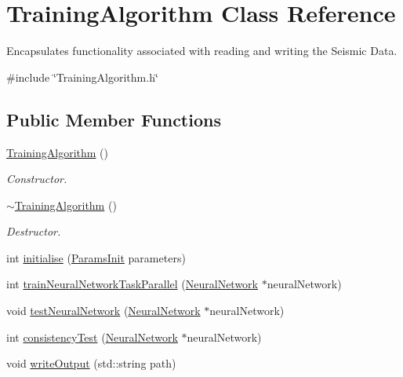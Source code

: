 \hypertarget{classTrainingAlgorithm}{}\section{Training\+Algorithm Class Reference}
\label{classTrainingAlgorithm}


Encapsulates functionality associated with reading and writing the Seismic Data.  




{\ttfamily \#include \char`\"{}Training\+Algorithm.\+h\char`\"{}}

\subsection*{Public Member Functions}
\begin{DoxyCompactItemize}
\item 
\hyperlink{classTrainingAlgorithm_a5f0707670ca944ac8ffe2c8a4d9cafca}{Training\+Algorithm} ()
\begin{DoxyCompactList}\small\item\em Constructor. \end{DoxyCompactList}\item 
\hyperlink{classTrainingAlgorithm_ac763e820148f7b31ecb9c7f9855b6399}{$\sim$\+Training\+Algorithm} ()
\begin{DoxyCompactList}\small\item\em Destructor. \end{DoxyCompactList}\item 
int \hyperlink{classTrainingAlgorithm_af535697499b4d26ac4375f2798b953df}{initialise} (\hyperlink{classParamsInit}{Params\+Init} parameters)
\item 
int \hyperlink{classTrainingAlgorithm_acf440cd131e39bebb1e2ce773516dab6}{train\+Neural\+Network\+Task\+Parallel} (\hyperlink{classNeuralNetwork}{Neural\+Network} $\ast$neural\+Network)
\item 
void \hyperlink{classTrainingAlgorithm_a309d3d7d6e19c9e8830a63c9824bb750}{test\+Neural\+Network} (\hyperlink{classNeuralNetwork}{Neural\+Network} $\ast$neural\+Network)
\item 
int \hyperlink{classTrainingAlgorithm_a733b9c2d4ad344a77d447b4e81a470a4}{consistency\+Test} (\hyperlink{classNeuralNetwork}{Neural\+Network} $\ast$neural\+Network)
\item 
void \hyperlink{classTrainingAlgorithm_aebd53f578737ebbf04406000af69ba57}{write\+Output} (std\+::string path)
\item 

\end{DoxyCompactItemize}
